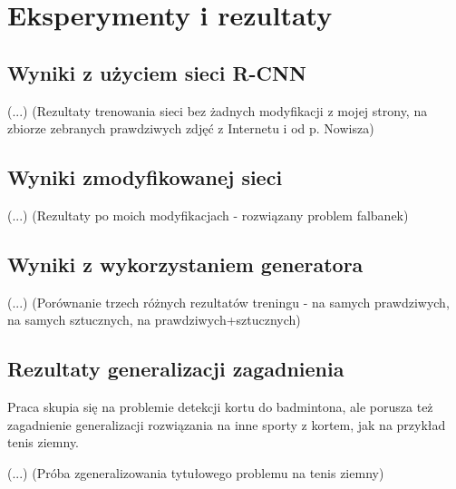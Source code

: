 \chapter{Eksperymenty i rezultaty}

\section{Wyniki z użyciem sieci R-CNN}

(...) (Rezultaty trenowania sieci bez żadnych modyfikacji z mojej strony, na zbiorze zebranych prawdziwych zdjęć z Internetu i od p. Nowisza)

\section{Wyniki zmodyfikowanej sieci}

(...) (Rezultaty po moich modyfikacjach - rozwiązany problem falbanek)

\section{Wyniki z wykorzystaniem generatora}
\label{sec:wyniki_generator}

(...) (Porównanie trzech różnych rezultatów treningu - na samych prawdziwych, na samych sztucznych, na prawdziwych+sztucznych)

\section{Rezultaty generalizacji zagadnienia}
\label{sec:generalizacja}

Praca skupia się na problemie detekcji kortu do badmintona, ale porusza też zagadnienie generalizacji rozwiązania na inne sporty z kortem, jak na przykład tenis ziemny.

(...) (Próba zgeneralizowania tytułowego problemu na tenis ziemny)
